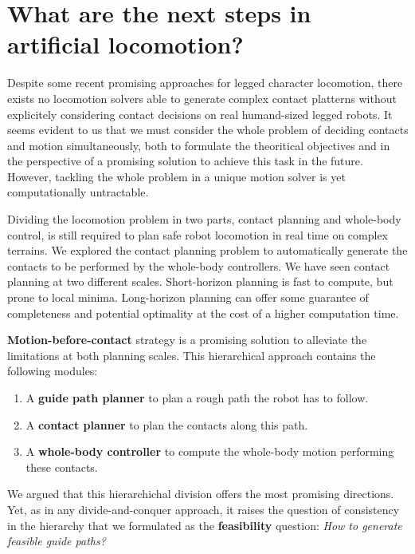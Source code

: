 \section{What are the next steps in artificial locomotion? \label{sota4}}

Despite some recent promising approaches for legged character locomotion, there exists no locomotion solvers able to generate complex contact platterns without explicitely considering contact decisions on real humand-sized legged robots.
It seems evident to us that we must consider the whole problem of deciding contacts and motion simultaneously, both to formulate the theoritical objectives and in the perspective of a promising solution to achieve this task in the future.
However, tackling the whole problem in a unique motion solver is yet computationally untractable.

Dividing the locomotion problem in two parts, contact planning and whole-body control, is still required to plan safe robot locomotion in real time on complex terrains.
We explored the contact planning problem to automatically generate the contacts to be performed by the whole-body controllers.
We have seen contact planning at two different scales.
Short-horizon planning is fast to compute, but prone to local minima.
Long-horizon planning can offer some guarantee of completeness and potential optimality at the cost of a higher computation time.

\textbf{Motion-before-contact} strategy is a promising solution to alleviate the limitations at both planning scales. 
This hierarchical approach contains the following modules:
\begin{enumerate}
    \item A \textbf{guide path planner} to plan a rough path the robot has to follow.
    \item A \textbf{contact planner} to plan the contacts along this path.
    \item A \textbf{whole-body controller} to compute the whole-body motion performing these contacts.
\end{enumerate}
We argued that this hierarchichal division offers the most promising directions. Yet, as in any divide-and-conquer approach, it raises the question of consistency in the hierarchy that we formulated as the \textbf{feasibility} question: \textit{How to generate feasible guide paths?}

